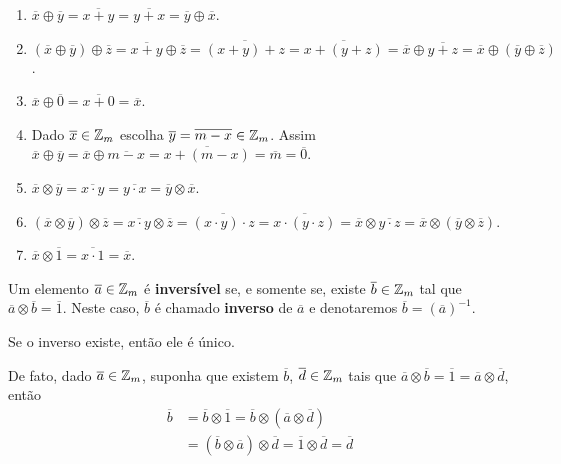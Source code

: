\begin{prova}
    \begin{enumerate}[label={\roman*})]
        \item $\overline{x} \oplus \overline{y} = \overline{x + y} = \overline{y + x} = \overline{y} \oplus \overline{x}$.

        \item $(\overline{x} \oplus \overline{y}) \oplus \overline{z} = \overline{x + y} \oplus \overline{z} = \overline{(x + y) + z} = \overline{x + (y + z)} = \overline{x} \oplus \overline{y + z} = \overline{x} \oplus (\overline{y} \oplus \overline{z})$.

        \item $\overline{x} \oplus \overline{0} = \overline{x + 0} = \overline{x}$.

        \item Dado $\overline{x} \in \mathbb{Z}_m$ escolha $\overline{y} = \overline{m - x} \in \mathbb{Z}_m$. Assim $\overline{x} \oplus \overline{y} = \overline{x} \oplus \overline{m - x} = \overline{x + (m - x)} = \overline{m} = \overline{0}$.

        \item $\overline{x} \otimes \overline{y} = \overline{x \cdot y} = \overline{y \cdot x} = \overline{y} \otimes \overline{x}$.

        \item $(\overline{x} \otimes \overline{y}) \otimes \overline{z} = \overline{x \cdot y} \otimes \overline{z} = \overline{(x \cdot y)\cdot z} = \overline{x\cdot(y \cdot z)} = \overline{x} \otimes \overline{y \cdot z} = \overline{x} \otimes (\overline{y}\otimes \overline{z})$.

        \item $\overline{x} \otimes \overline{1} = \overline{x \cdot 1} = \overline{x}$.
    \end{enumerate}
\end{prova}

\begin{definicao}
    Um elemento $\overline{a} \in \mathbb{Z}_m$ é \textbf{inversível} se, e somente se, existe $\overline{b} \in \mathbb{Z}_m$ tal que $\overline{a} \otimes \overline{b} = \overline{1}$. Neste caso, $\overline{b}$ é chamado \textbf{inverso} de $\overline{a}$ e denotaremos $\overline{b} = (\overline{a})^{-1}$.
\end{definicao}

\begin{proposicao}
    Se o inverso existe, então ele é único.
\end{proposicao}
\begin{prova}
    De fato, dado $\overline{a} \in \mathbb{Z}_m$, suponha que existem $\overline{b}$, $\overline{d} \in \mathbb{Z}_m$ tais que $\overline{a} \otimes \overline{b} = \overline{1} = \overline{a} \otimes \overline{d}$, então
    \begin{align*}
        \overline{b} &= \overline{b} \otimes \overline{1} = \overline{b} \otimes (\overline{a} \otimes \overline{d})\\ &= (\overline{b} \otimes \overline{a}) \otimes \overline{d} = \overline{1} \otimes \overline{d} = \overline{d}
    \end{align*}
\end{prova}

